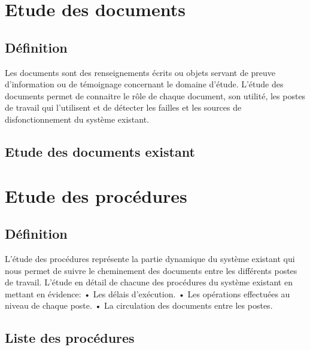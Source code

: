 \section{Etude des documents}
\subsection{Définition}
Les documents sont des renseignements écrits ou objets servant de preuve
d’information ou de témoignage concernant le domaine d'étude.
L'étude des documents permet de connaitre le rôle de chaque document, son
utilité, les postes de travail qui l'utilisent et de détecter les failles et les sources
de disfonctionnement du système existant.
\subsection{Etude des documents existant}













\section{Etude des procédures}
\subsection{Définition}
L'étude des procédures représente la partie dynamique du système existant qui
nous permet de suivre le cheminement des documents entre les différents
postes de travail.
L'étude en détail de chacune des procédures du système existant en mettant en
évidence:
• Les délais d'exécution.
• Les opérations effectuées au niveau de chaque poste.
• La circulation des documents entre les postes.
\subsection{Liste des procédures}
